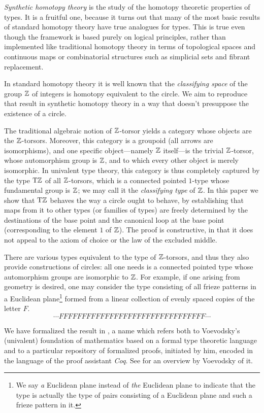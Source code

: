 \documentclass[a4paper,12pt]{amsart}
\begin{document}
\emph{Synthetic homotopy theory} is the study of the homotopy theoretic properties of types.  It is a fruitful one, because it turns out that many
of the most basic results of standard homotopy theory have true analogues for types.  This is true even though the framework is based purely on
logical principles, rather than implemented like traditional homotopy theory in terms of topological spaces and continuous maps or combinatorial
structures such as simplicial sets and fibrant replacement.

In standard homotopy theory it is well known that the \emph{classifying space} of the group $\mathbb{Z}$ of integers is
homotopy equivalent to the circle.  We aim to reproduce that result in synthetic homotopy theory in a way that doesn't presuppose the existence of a circle.

The traditional algebraic notion of $\mathbb{Z}$-torsor yields a category whose objects are the $\mathbb{Z}$-torsors.
Moreover, this category is a groupoid (all arrows are isomorphisms), and
one specific object---namely $\mathbb{Z}$ itself---is the trivial $\mathbb{Z}$-torsor,
whose automorphism group is $\mathbb{Z}$,
and to which every other object is merely isomorphic.
In univalent type theory, this category is thus
completely captured by the type ${\mathrm{T}\mathbb{Z}}$ of all $\mathbb{Z}$-torsors, which
is a connected pointed $1$-type whose fundamental group is $\mathbb{Z}$;
we may call it the \emph{classifying type} of $\mathbb{Z}$.
In this paper we show that ${\mathrm{T}\mathbb{Z}}$ behaves the way a circle ought to behave,
by establishing that maps from it to other types (or families of types) are freely determined
by the destinations of the base point and the canonical loop at the base point (corresponding to the element $1$ of $\mathbb{Z}$).
The proof is constructive, in that it does not appeal to the axiom of choice or the law of the excluded middle.

There are various types equivalent to the type of $\mathbb{Z}$-torsors, and thus they also provide constructions of circles: all one needs is a
connected pointed type whose automorphism groups are isomorphic to $\mathbb{Z}$.  For example, if one arising from geometry is desired, one may
consider the type consisting of all frieze patterns in a Euclidean plane\footnote{%
  We say \emph{a} Euclidean plane instead of \emph{the} Euclidean
  plane to indicate that the type is actually the type of pairs consisting of a Euclidean plane and such a frieze pattern in it.}
formed from a
linear collection of evenly spaced copies of the letter $F$.
\[
  \cdots FFFFFFFFFFFFFFFFFFFFFFFFFFFFFFFF \cdots
\]

We have formalized the result in \UniMath{}, a name which refers both to Voevodsky's (univalent) foundation of mathematics based on a formal
type theoretic language and to a particular repository \cite{UniMath} of formalized proofs, initiated by him, encoded in the language of the
proof assistant \emph{Coq}.
See \cite{VV-UniMath-1} for an overview by Voevodsky of it.
\end{document}
